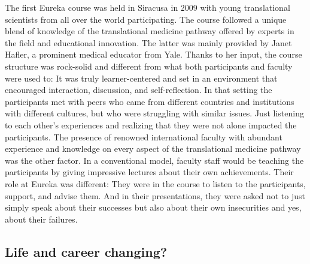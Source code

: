 \documentclass[authordate, editorial]{jote-new-article}
\begin{document}
	The first Eureka course was held in Siracusa in 2009 with young translational scientists from all over the world participating. The course followed a unique blend of knowledge of the translational medicine pathway offered by experts in the field and educational innovation. The latter was mainly provided by Janet Hafler, a prominent medical educator from Yale. Thanks to her input, the course structure was rock-solid and different from what both participants and faculty were used to: It was truly learner-centered and set in an environment that encouraged interaction, discussion, and self-reflection. In that setting the participants met with peers who came from different countries and institutions with different cultures, but who were struggling with similar issues. Just listening to each other's experiences and realizing that they were not alone impacted the participants. The presence of renowned international faculty with abundant experience and knowledge on every aspect of the translational medicine pathway was the other factor. In a conventional model, faculty staff would be teaching the participants by giving impressive lectures about their own achievements. Their role at Eureka was different: They were in the course to listen to the participants, support, and advise them. And in their presentations, they were asked not to just simply speak about their successes but also about their own insecurities and yes, about their failures.



	\subsection{Life and career changing?}
\end{document}

